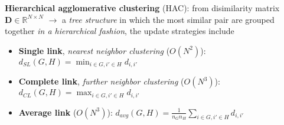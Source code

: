 \textbf{Hierarchical agglomerative clustering} (HAC): from disimilarity matrix $\mathbf{D}\in \mathbb{R}^{N\times N}$ 
$\to$ a \textit{tree structure} in which the most similar pair are grouped together \textit{in a hierarchical fashion},
the update strategies include
\begin{itemize}
    \item \textbf{Single link}, \textit{nearest neighbor clustering} ($O(N^2)$): $d_{SL}(G,H)=\min_{i\in G,i'\in H}d_{i,i'}$
    \item \textbf{Complete link}, \textit{further neighbor clustering} ($O(N^3)$): $d_{CL}(G,H)=\max_{i\in G,i'\in H}d_{i,i'}$
    \item \textbf{Average link} ($O(N^3)$): $d_{avg}(G,H)=\frac{1}{n_Gn_H}\sum_{i\in G,i'\in H}d_{i,i'}$
\end{itemize}

